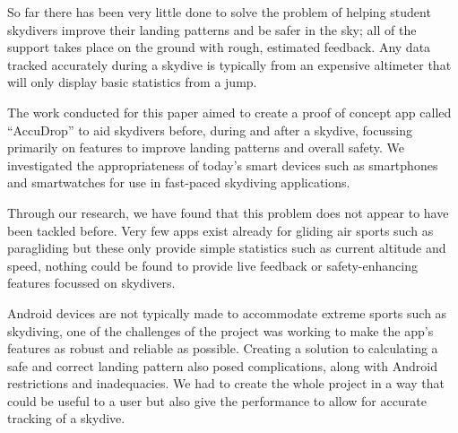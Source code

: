 So far there has been very little done to solve the problem of helping student skydivers improve their landing patterns and be safer in the sky; all of the support takes place on the ground with rough, estimated feedback. Any data tracked accurately during a skydive is typically from an expensive altimeter that will only display basic statistics from a jump.

The work conducted for this paper aimed to create a proof of concept app called ``AccuDrop'' to aid skydivers before, during and after a skydive, focussing primarily on features to improve landing patterns and overall safety. We investigated the appropriateness of today's smart devices such as smartphones and smartwatches for use in fast-paced skydiving applications.

Through our research, we have found that this problem does not appear to have been tackled before. Very few apps exist already for gliding air sports such as paragliding but these only provide simple statistics such as current altitude and speed, nothing could be found to provide live feedback or safety-enhancing features focussed on skydivers.

Android devices are not typically made to accommodate extreme sports such as skydiving, one of the challenges of the project was working to make the app's features as robust and reliable as possible. Creating a solution to calculating a safe and correct landing pattern also posed complications, along with Android restrictions and inadequacies. We had to create the whole project in a way that could be useful to a user but also give the performance to allow for accurate tracking of a skydive.

